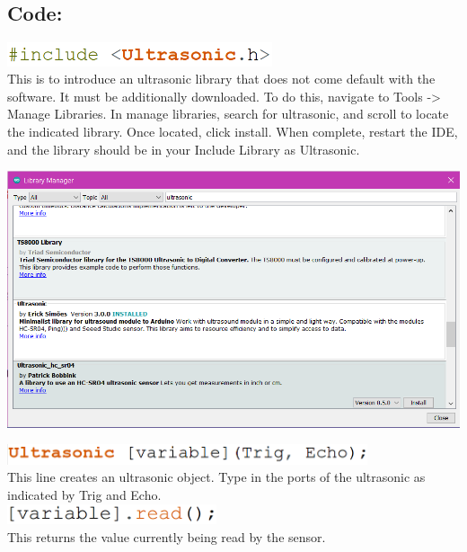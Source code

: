 \documentclass[a4paper,12pt]{report}
\newcommand{\diagramWidth}{150mm}
\newcommand{\codeHeight}{7mm}
\begin{document}
    \subsection*{Code:}
        \begin{mdframed}[linewidth = 3, linecolor = turbo_purple]
            \includegraphics[height = \codeHeight]{Assets/include_u.png} \\
            This is to introduce an ultrasonic library that does not come default with the software. It must be additionally downloaded. To do this, navigate to Tools -> Manage Libraries. In manage libraries, search for ultrasonic, and scroll to locate the indicated library. Once located, click install. When complete, restart the IDE, and the library should be in your Include Library as Ultrasonic. \\
            \begin{center}
                \includegraphics[width = \diagramWidth]{Assets/ultrasonic_library.png}
            \end{center}
            \includegraphics[height = 6mm]{Assets/ultrasonic_init.png} \\
            This line creates an ultrasonic object. Type in the ports of the ultrasonic as indicated by Trig and Echo. \\
            \includegraphics[height = 6mm]{Assets/ultrasonic_read.png} \\
            This returns the value currently being read by the sensor.
        \end{mdframed}
\end{document}

